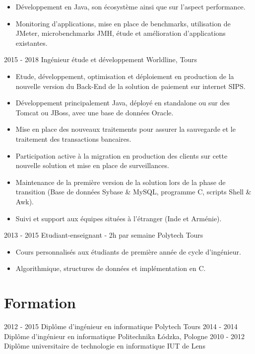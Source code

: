 \documentclass[]{friggeri-cv}
\begin{document}
\begin{entrylist}
{\begin{itemize}[leftmargin=*]
		\item Développement en Java, son écosystème ainsi que sur l'aspect performance.
		\item Monitoring d'applications, mise en place de benchmarks, utilisation de JMeter, microbenchmarks JMH, étude et amélioration d'applications existantes.
	\end{itemize}
	}
    \entry
    {2015 - 2018}
    {Ingénieur étude et développement}
    {Worldline, Tours}
    {
    \vspace{-0.8\baselineskip}
    \begin{itemize}[leftmargin=*]
		\item Etude, développement, optimisation et déploiement en production de la nouvelle version du Back-End de la solution de paiement sur internet SIPS.
		\item Développement principalement Java, déployé en standalone ou sur des Tomcat ou JBoss,  avec une base de données Oracle.
		\item Mise  en place des nouveaux traitements pour assurer la sauvegarde et le traitement des transactions bancaires.
		\item Participation active à la migration en production des clients sur cette nouvelle solution et mise en place de surveillances.
		\item Maintenance de la première version de la solution lors de la phase de transition (Base de données Sybase \& MySQL, programme C, scripts Shell \& Awk).
		\item Suivi et support aux équipes situées à l'étranger (Inde et Arménie).
	\end{itemize}
}
    \entry
    {2013 - 2015}
    {Etudiant-enseignant - 2h par semaine}
    {Polytech Tours}
    {
    \vspace{-0.8\baselineskip}
	\begin{itemize}[leftmargin=*]
		\item Cours personnalisés aux étudiants de première année de cycle d'ingénieur. 
		\item Algorithmique, structures de données et implémentation en C.
	\end{itemize}
    }
\end{entrylist}

\vspace{6pt}

\section{Formation}
\vspace{-5pt}
\begin{entrylist}
  \vspace{-8pt}
  \entry
    {2012 - 2015}
    {Diplôme d'ingénieur en informatique}
    {Polytech Tours}
    {}
  \vspace{-6pt}    
  \entry
    {2014 - 2014}
    {Diplôme d'ingénieur en informatique}
    {Politechnika Łódzka, Pologne}
    {}
  \entry
    {2010 - 2012}
    {Diplôme universitaire de technologie en informatique}
    {IUT de Lens}
    {}
\end{entrylist}
\end{document}
